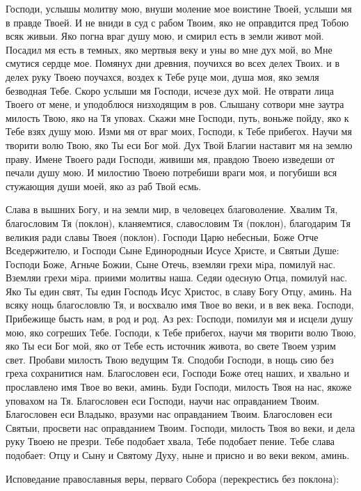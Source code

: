 Господи, услышы молитву мою, внуши моление мое воистине Твоей, услыши мя в правде Твоей. И не вниди в суд с рабом Твоим, яко не оправдится пред Тобою всяк живыи. Яко погна враг душу мою, и смирил есть в земли живот мой. Посадил мя есть в темных, яко мертвыя веку и уны во мне дух мой, во Мне смутися сердце мое. Помянух дни древния, поучихся во всех делех Твоих. и в делех руку Твоею поучахся, воздех к Тебе руце мои, душа моя, яко земля безводная Тебе. Скоро услыши мя Господи, исчезе дух мой. Не отврати лица Твоего от мене, и уподоблюся низходящим в ров. Слышану сотвори мне заутра милость Твою, яко на Тя уповах. Скажи мне Господи, путь, воньже пойду, яко к Тебе взях душу мою. Изми мя от враг моих, Господи, к Тебе прибегох. Научи мя творити волю Твою, яко Ты еси Бог мой. Дух Твой Благии наставит мя на землю праву. Имене Твоего ради Господи, живиши мя, правдою Твоею изведеши от печали душу мою. И милостию Твоею потребиши враги моя, и погубиши вся стужающия души моей, яко аз раб Твой есмь.


Слава в вышних Богу, и на земли мир, в человецех благоволение. Хвалим Тя, благословим Тя (поклон), кланяемтися, славословим Тя (поклон), благодарим Тя великия ради славы Твоея (поклон). Господи Царю небесныи, Боже Отче Вседержителю, и Господи Сыне Единородныи Исусе Христе, и Святыи Душе: Господи Боже, Агньче Божии, Сыне Отечь, вземляи грехи мiра, помилуй нас. Вземляи грехи мiра. приими молитвы наша. Седяи одесную Отца, помилуй нас. Яко Ты един свят, Ты един Господь Исус Христос, в славу Богу Отцу, аминь. На всяку нощь благословлю Тя, и восхвалю имя Твое во веки, и в век века. Господи, Прибежище бысть нам, в род и род. Аз рех: Господи, помилуи мя и исцели душу мою, яко согреших Тебе. Господи, к Тебе прибегох, научи мя творити волю Твою, яко Ты еси Бог мой, яко от Тебе есть источник живота, во свете Твоем узрим свет. Пробави милость Твою ведущим Тя. Сподоби Господи, в нощь сию без греха сохранитися нам. Благословен еси, Господи Боже отец наших, и хвально и прославлено имя Твое во веки,  аминь. Буди Господи, милость Твоя на нас, якоже уповахом на Тя. Благословен еси Господи, научи нас оправданием Твоим. Благословен еси Владыко, вразуми нас оправданием Твоим. Благословен еси Святыи, просвети нас оправданием Твоим. Господи, милость Твоя во веки, и дела руку Твоею не презри. Тебе подобает хвала, Тебе подобает пение. Тебе слава подобает: Отцу и Сыну и Святому Духу, ныне и присно и во веки веком, аминь.

Исповедание православныя веры, перваго Собора (перекрестись без поклона): 

